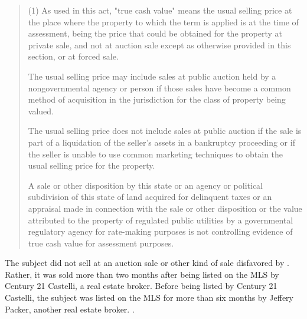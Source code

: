 \documentclass[12pt,\documentclassflag]{michiganCourtOfAppealsBrief}
\begin{document}
\begin{quotation}
  (1) As used in this act, "true cash value" means the usual selling price at the place where the property to which the term is applied is at the time of assessment, being the price that could be obtained for the property at private sale, and not at auction sale except as otherwise provided in this section, or at forced sale.

  The usual selling price may include sales at public auction held by a nongovernmental agency or person if those sales have become a common method of acquisition in the jurisdiction for the class of property being valued.

  The usual selling price does not include sales at public auction if the sale is part of a liquidation of the seller's assets in a bankruptcy proceeding or if the seller is unable to use common marketing techniques to obtain the usual selling price for the property.

  A sale or other disposition by this state or an agency or political subdivision of this state of land acquired for delinquent taxes or an appraisal made in connection with the sale or other disposition or the value attributed to the property of regulated public utilities by a governmental regulatory agency for rate-making purposes is not controlling evidence of true cash value for assessment purposes.

\end{quotation}

The subject did not sell at an auction sale or other kind of sale disfavored by \cite[s]{MCL 211.27(1)}. Rather, it was sold more than two months after being listed on the MLS by Century 21 Castelli, a real estate broker. Before being listed by Century 21 Castelli, the subject was listed on the MLS for more than six months by Jeffery Packer, another real estate broker.
\mlsHistory.
\end{document}
